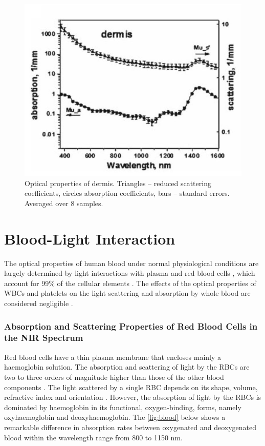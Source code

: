 \begin{figure}[H]
\centering
\includegraphics[scale=0.5]{figures/dermis.JPG}
\captionsetup{justification=centering}
\caption[Optical properties of dermis]{Optical properties of dermis. Triangles – reduced scattering coefficients,  circles absorption coefficients, bars – standard errors. Averaged over 8 samples.}\label{fig:dermis}
\end{figure}


\section{Blood-Light Interaction}


The optical properties of human blood under normal physiological conditions are largely determined by light interactions with plasma and red blood cells \parencite{opticsOfBlood}, which account for 99\% of the cellular elements \parencite{opticsOfBlood1}. 
The effects of the optical properties of WBCs and platelets on the light scattering and absorption by whole blood are considered negligible \parencite{opticsOfBlood}.

\subsubsection{Absorption and Scattering Properties of Red Blood Cells in the NIR Spectrum}
Red blood cells have a thin plasma membrane that encloses mainly a haemoglobin solution. The absorption and scattering of light by the RBCs are two to three orders of magnitude higher than those of the other blood components \parencite{opticsOfBlood1}. The light scattered by a single RBC depends on
its shape, volume, refractive index and orientation \parencite{opticsOfBlood1}. However, the absorption of light by the RBCs is dominated by haemoglobin in its functional, oxygen-binding, forms, namely oxyhaemoglobin and deoxyhaemoglobin.
The  \autoref{fig:blood} below shows a remarkable difference in absorption rates between oxygenated and deoxygenated blood within the wavelength range from 800 to 1150 nm.


